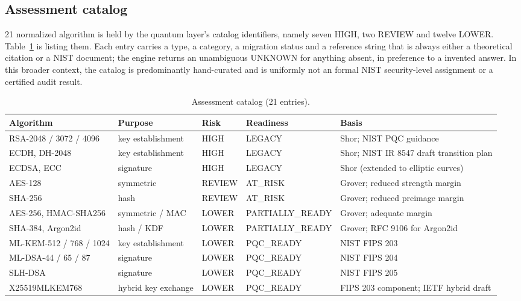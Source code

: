 \documentclass[conference]{IEEEtran}
\begin{document}
\subsection{Assessment catalog}
21 normalized algorithm is held by the quantum layer's catalog identifiers, namely seven HIGH, two REVIEW and twelve LOWER. Table~\ref{tab:catalog} is listing them. Each entry carries a type, a category, a migration status and a reference string that is always either a theoretical citation or a NIST document; the engine returns an unambiguous UNKNOWN for anything absent, in preference to a invented answer. In this broader context, the catalog is predominantly hand-curated and is uniformly not an formal NIST security-level assignment or a certified audit result.

\begin{table}[t]
\caption{Assessment catalog (21 entries).}
\label{tab:catalog}
\centering
\footnotesize
\begin{tabular}{@{}l l l l l@{}}
\toprule
Algorithm & Purpose & Risk & Readiness & Basis \\
\midrule
RSA-2048 / 3072 / 4096 & key establishment & HIGH & LEGACY & Shor; NIST PQC guidance \\
ECDH, DH-2048 & key establishment & HIGH & LEGACY & Shor; NIST IR 8547 draft transition plan \\
ECDSA, ECC & signature & HIGH & LEGACY & Shor (extended to elliptic curves) \\
AES-128 & symmetric & REVIEW & AT\_RISK & Grover; reduced strength margin \\
SHA-256 & hash & REVIEW & AT\_RISK & Grover; reduced preimage margin \\
AES-256, HMAC-SHA256 & symmetric / MAC & LOWER & PARTIALLY\_READY & Grover; adequate margin \\
SHA-384, Argon2id & hash / KDF & LOWER & PARTIALLY\_READY & Grover; RFC 9106 for Argon2id \\
ML-KEM-512 / 768 / 1024 & key establishment & LOWER & PQC\_READY & NIST FIPS 203 \\
ML-DSA-44 / 65 / 87 & signature & LOWER & PQC\_READY & NIST FIPS 204 \\
SLH-DSA & signature & LOWER & PQC\_READY & NIST FIPS 205 \\
X25519MLKEM768 & hybrid key exchange & LOWER & PQC\_READY & FIPS 203 component; IETF hybrid draft \\
\bottomrule
\end{tabular}
\end{table}
\end{document}
